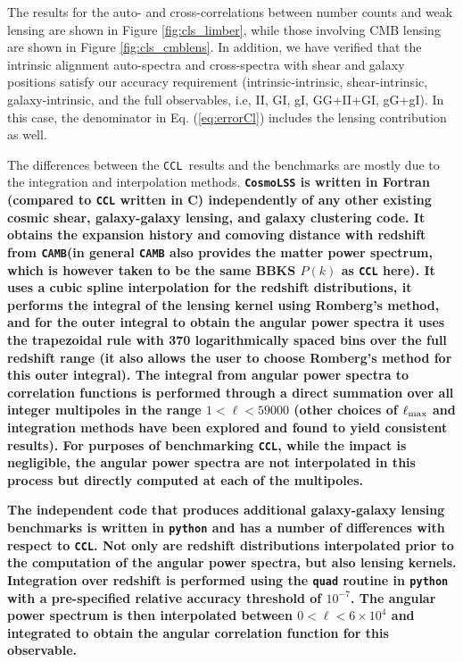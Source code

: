 \documentclass[\docopts]{\docclass}
\newcommand{\ccl}{{\tt CCL}\xspace}
\newcommand{\camb}{{\tt CAMB}\xspace}
\begin{document}
The results for the auto- and cross-correlations between number counts and weak lensing are shown in Figure \ref{fig:cls_limber}, while those involving CMB lensing are shown in Figure \ref{fig:cls_cmblens}. In addition, we have verified that the intrinsic alignment auto-spectra and cross-spectra with shear and galaxy positions satisfy our accuracy requirement (intrinsic-intrinsic, shear-intrinsic, galaxy-intrinsic, and the full observables, i.e, II, GI, gI, GG+II+GI, gG+gI). In this case, the denominator in Eq. (\ref{eq:errorCl}) includes the lensing contribution as well.

The differences between the \ccl~results and the benchmarks are mostly due to the integration and interpolation methods. {\bf {\tt CosmoLSS} is written in Fortran (compared to \ccl written in C) independently of any other existing cosmic shear, galaxy-galaxy lensing, and galaxy clustering code. It obtains the expansion history and comoving distance with redshift from \camb (in general \camb also provides the matter power spectrum, which is however taken to be the same BBKS $P(k)$ as \ccl here). It uses a cubic spline interpolation for the redshift distributions, it performs the integral of the lensing kernel using Romberg's method, and for the outer integral to obtain the angular power spectra it uses the trapezoidal rule with 370 logarithmically spaced bins over the full redshift range (it also allows the user to choose Romberg's method for this outer integral). The integral from angular power spectra to correlation functions is performed through a direct summation over all integer multipoles in the range $1<\ell<59000$ (other choices of $\ell_{\rm max}$ and integration methods have been explored and found to yield consistent results). For purposes of benchmarking \ccl, while the impact is negligible, the angular power spectra are not interpolated in this process but directly computed at each of the multipoles.} 

{\bf The independent code that produces additional galaxy-galaxy lensing benchmarks is written in {\tt python} and has a number of differences with respect to \ccl. Not only are redshift distributions interpolated prior to the computation of the angular power spectra, but also lensing kernels. Integration over redshift is performed using the {\tt quad} routine in {\tt python} with a pre-specified relative accuracy threshold of $10^{-7}$. The angular power spectrum is then interpolated between $0<\ell<6\times 10^4$ and integrated to obtain the angular correlation function for this observable.}
\end{document}
